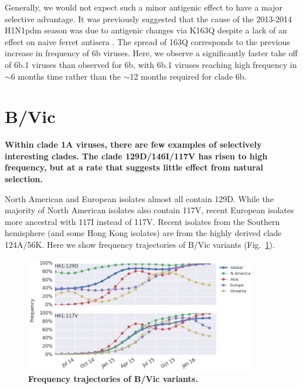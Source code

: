 \documentclass[11pt,oneside,letterpaper]{article}
\begin{document}
\pagebreak

Generally, we would not expect such a minor antigenic effect to have a major selective advantage. It was previously suggested that the cause of the 2013-2014 H1N1pdm season was due to antigenic changes via K163Q despite a lack of an effect on naive ferret antisera \cite{linderman2014potential}. The spread of 163Q corresponds to the previous increase in frequency of 6b viruses. Here, we observe a significantly faster take off of 6b.1 viruses than observed for 6b, with 6b.1 viruses reaching high frequency in $\sim$6 months time rather than the $\sim$12 months required for clade 6b.

\clearpage
\pagebreak

\section*{B/Vic}

\textbf{Within clade 1A viruses, there are few examples of selectively interesting clades. The clade 129D/146I/117V has risen to high frequency, but at a rate that suggests little effect from natural selection.}

North American and European isolates almost all contain 129D. While the majority of North American isolates also contain 117V, recent European isolates more ancestral with 117I instead of 117V. Recent isolates from the Southern hemisphere (and some Hong Kong isolates) are from the highly derived clade 124A/56K. Here we show frequency trajectories of B/Vic variants (Fig.\ \ref{Vic_mutations}).

\begin{figure}[h!]
	\centering		
	\includegraphics[width=0.9\textwidth]{../figures/feb-2016/Vic_mutations.png}
	\caption{\textbf{Frequency trajectories of B/Vic variants.} 
	}
	\label{Vic_mutations}
\end{figure}
\end{document}
